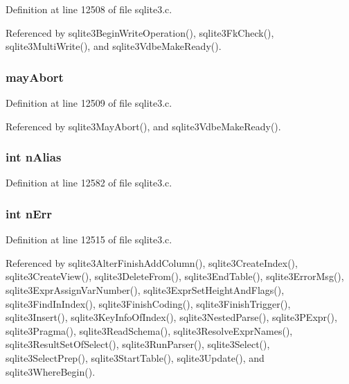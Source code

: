 Definition at line 12508 of file sqlite3.\+c.



Referenced by sqlite3\+Begin\+Write\+Operation(), sqlite3\+Fk\+Check(), sqlite3\+Multi\+Write(), and sqlite3\+Vdbe\+Make\+Ready().

\hypertarget{struct_parse_a4ebd564464352b98cd6d48895c32a25c}{}
\subsubsection[{may\+Abort}]{ may\+Abort}\label{struct_parse_a4ebd564464352b98cd6d48895c32a25c}


Definition at line 12509 of file sqlite3.\+c.



Referenced by sqlite3\+May\+Abort(), and sqlite3\+Vdbe\+Make\+Ready().

\hypertarget{struct_parse_acec6917b7abc43bce31bbdc924c37872}{}
\subsubsection[{n\+Alias}]{\setlength{\rightskip}{0pt plus 5cm}int n\+Alias}\label{struct_parse_acec6917b7abc43bce31bbdc924c37872}


Definition at line 12582 of file sqlite3.\+c.

\hypertarget{struct_parse_a60ebed73c4dbe105fdc4be21a01fd09c}{}
\subsubsection[{n\+Err}]{\setlength{\rightskip}{0pt plus 5cm}int n\+Err}\label{struct_parse_a60ebed73c4dbe105fdc4be21a01fd09c}


Definition at line 12515 of file sqlite3.\+c.



Referenced by sqlite3\+Alter\+Finish\+Add\+Column(), sqlite3\+Create\+Index(), sqlite3\+Create\+View(), sqlite3\+Delete\+From(), sqlite3\+End\+Table(), sqlite3\+Error\+Msg(), sqlite3\+Expr\+Assign\+Var\+Number(), sqlite3\+Expr\+Set\+Height\+And\+Flags(), sqlite3\+Find\+In\+Index(), sqlite3\+Finish\+Coding(), sqlite3\+Finish\+Trigger(), sqlite3\+Insert(), sqlite3\+Key\+Info\+Of\+Index(), sqlite3\+Nested\+Parse(), sqlite3\+P\+Expr(), sqlite3\+Pragma(), sqlite3\+Read\+Schema(), sqlite3\+Resolve\+Expr\+Names(), sqlite3\+Result\+Set\+Of\+Select(), sqlite3\+Run\+Parser(), sqlite3\+Select(), sqlite3\+Select\+Prep(), sqlite3\+Start\+Table(), sqlite3\+Update(), and sqlite3\+Where\+Begin().

